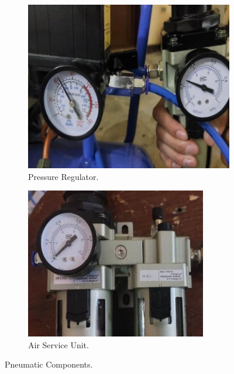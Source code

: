 \documentclass[11pt, twocolumn]{article}
\begin{document}
\begin{itemize}[leftmargin=0pt, itemindent=10pt]
\begin{figure}[h]
        \vspace{0.2cm}
    
        \begin{subfigure}[b]{0.49\columnwidth}
            \centering
            \includegraphics[width=\linewidth]{Images/Pressure Regulator.jpg}
            \caption{Pressure Regulator.}
            \label{fig:regulator}
        \end{subfigure}
        \hfill
        \begin{subfigure}[b]{0.49\columnwidth}
            \centering
            \includegraphics[width=\linewidth]{Images/Air Service Unit.jpg} 
            \caption{Air Service Unit.}
            \label{fig:air_service_unit}
        \end{subfigure}
    
        \caption{Pneumatic Components.}
        \label{fig:pneumatic_components}
    
    \end{figure}
\end{itemize}
\end{document}
